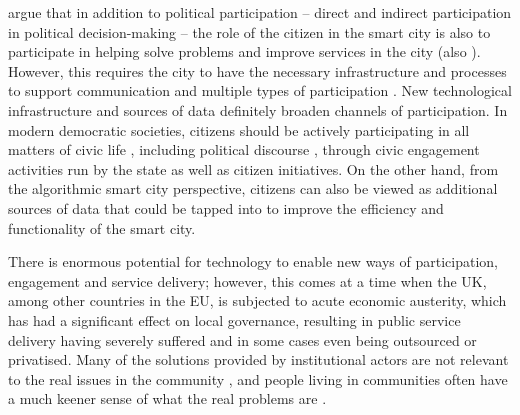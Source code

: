 \citet{berntzen_citizens_2018} argue that in addition to political participation -- direct and indirect participation in political decision-making -- the role of the citizen in the smart city is also to participate in helping solve problems and improve services in the city (also \citep{townsend_smart_2013}). However, this requires the city to have the necessary infrastructure and processes to support communication and multiple types of participation \citep{berntzen_regulatory_2010}. New technological infrastructure and sources of data definitely broaden channels of participation. In modern democratic societies, citizens should be actively participating in all matters of civic life \citep{chourabi_understanding_2012}, including political discourse \citep{hoffman_participation_2012}, through civic engagement activities run by the state \citep{berntzen_citizens_2018} as well as citizen initiatives. On the other hand, from the algorithmic smart city perspective, citizens can also be viewed as additional sources of data that could be tapped into to improve the efficiency and functionality of the smart city.

There is enormous potential for technology to enable new ways of participation, engagement and service delivery; however, this comes at a time when the UK, among other countries in the EU, is subjected to acute economic austerity, which has had a significant effect on local governance, resulting in public service delivery having severely suffered and in some cases even being outsourced or privatised. Many of the solutions provided by institutional actors are not relevant to the real issues in the community \citep{boehner_data_2016}, and people living in communities often have a much keener sense of what the real problems are \citep{disalvo_neighborhood_2008}.

